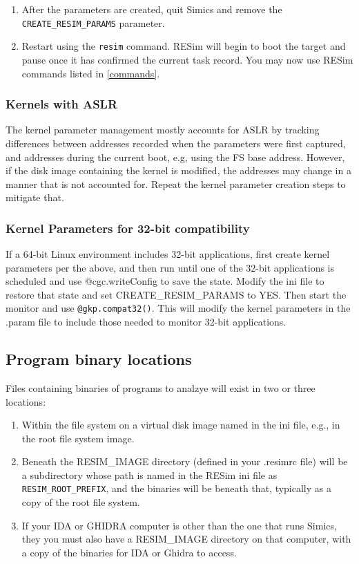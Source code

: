 \documentclass[titlepage]{article}
\begin{document}
\begin{enumerate}
with the target system via its console, e.g., to schedule a new process.  If it displays a message saying it is not in the kernel,
try running ahead a bit, e.g., {\tt r 10000} and try the gkp.go command again.  For ARM platforms set the PLATFORM env value. 
\item After the parameters are created, quit Simics and remove the {\tt CREATE\_RESIM\_PARAMS} parameter.
\item Restart using the {\tt resim} command.  RESim will begin to boot the target and pause once it has confirmed the current task record.  You
may now use RESim commands listed in \ref{commands}.
\end{enumerate}

\subsubsection{Kernels with ASLR}
The kernel parameter management mostly accounts for ASLR by tracking differences between addresses recorded when the parameters were first
captured, and addresses during the current boot, e.g, using the FS base address.  However, if the disk image containing the kernel is modified,
the addresses may change in a manner that is not accounted for.  Repeat the kernel parameter creation steps to mitigate that.

\subsubsection{Kernel Parameters for 32-bit compatibility}
If a 64-bit Linux environment includes 32-bit applications, first create kernel parameters per the above, and then run until one of the 32-bit applications
is scheduled and use @cgc.writeConfig to save
the state.  Modify the ini file to restore that state and set CREATE\_RESIM\_PARAMS to YES.  Then start the monitor and use
{\tt @gkp.compat32()}.  This will modify the kernel parameters in the .param file to include those needed to monitor 32-bit applications.

\subsection{Program binary locations}
\label{program-binaries}
Files containing binaries of programs to analzye will exist in two or three locations:
\begin{enumerate}
\item Within the file system on a virtual disk image named in the ini file, e.g., in the root file system image.
\item Beneath the RESIM\_IMAGE directory (defined in your .resimrc file) will be a subdirectory whose path is named in the
RESim ini file as {\tt RESIM\_ROOT\_PREFIX}, and the binaries will be beneath that, typically as a copy of the root file system.
\item If your IDA or GHIDRA computer is other than the one that runs Simics, they you must also have a RESIM\_IMAGE directory on that
computer, with a copy of the binaries for IDA or Ghidra to access.
\end{enumerate}
\end{document}
